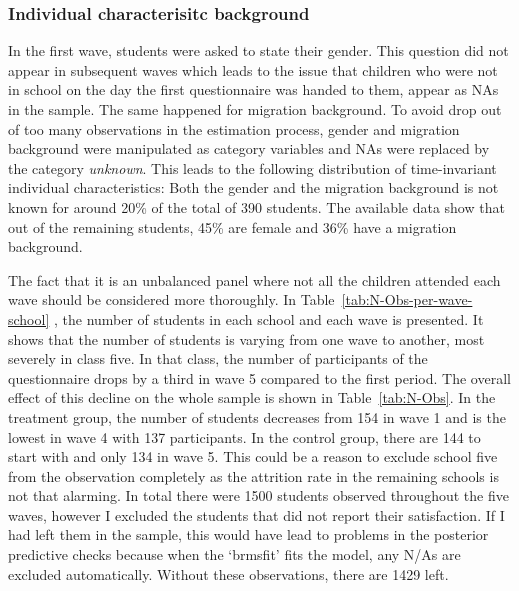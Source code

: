 \documentclass[a4, 12pt]{article}
\begin{document}
\hypertarget{individual-characterisitc-background}{%
\subsubsection{Individual characterisitc background}\label{individual-characterisitc-background}}

In the first wave, students were asked to state their gender. This question did not appear in subsequent waves which leads to the issue that children who were not in school on the day the first questionnaire was handed to them, appear as NAs in the sample. The same happened for migration background. To avoid drop out of too many observations in the estimation process, gender and migration background were manipulated as category variables and NAs were replaced by the category \emph{unknown}. This leads to the following distribution of time-invariant individual characteristics: Both the gender and the migration background is not known for around 20\% of the total of 390 students. The available data show that out of the remaining students, 45\% are female and 36\% have a migration background.

The fact that it is an unbalanced panel where not all the children attended each wave should be considered more thoroughly. In Table~\ref{tab:N-Obs-per-wave-school} , the number of students in each school and each wave is presented. It shows that the number of students is varying from one wave to another, most severely in class five. In that class, the number of participants of the questionnaire drops by a third in wave 5 compared to the first period. The overall effect of this decline on the whole sample is shown in Table~\ref{tab:N-Obs}. In the treatment group, the number of students decreases from 154 in wave 1 and is the lowest in wave 4 with 137 participants. In the control group, there are 144 to start with and only 134 in wave 5. This could be a reason to exclude school five from the observation completely as the attrition rate in the remaining schools is not that alarming. In total there were 1500 students observed throughout the five waves, however I excluded the students that did not report their satisfaction. If I had left them in the sample, this would have lead to problems in the posterior predictive checks because when the `brmsfit' fits the model, any N/As are excluded automatically. Without these observations, there are 1429 left.
\end{document}
